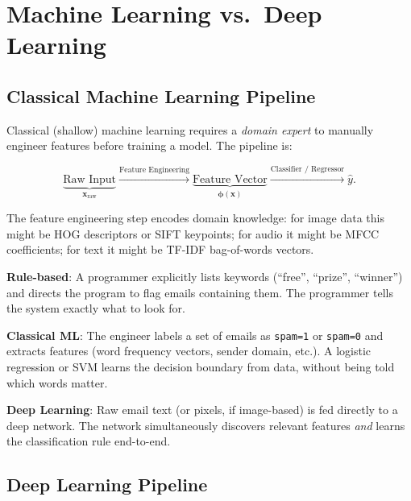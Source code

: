 \documentclass[12pt,a4paper]{article}
\begin{document}
\section{Machine Learning vs.\ Deep Learning}
\label{sec:mldl}

\subsection{Classical Machine Learning Pipeline}
\label{subsec:classical_ml}

Classical (shallow) machine learning requires a \emph{domain expert} to
manually engineer features before training a model.  The pipeline is:

\begin{equation}
  \label{eq:ml_pipeline}
  \underbrace{\text{Raw Input}}_{\mathbf{x}_\mathrm{raw}}
  \xrightarrow{\text{Feature Engineering}}
  \underbrace{\text{Feature Vector}}_{\boldsymbol{\phi}(\mathbf{x})}
  \xrightarrow{\text{Classifier / Regressor}}
  \hat{y}.
\end{equation}

The feature engineering step encodes domain knowledge: for image data this
might be HOG descriptors or SIFT keypoints; for audio it might be MFCC
coefficients; for text it might be TF-IDF bag-of-words vectors.

\begin{example}[title=Spam Email Detection (Rule-Based vs.\ ML)]
\textbf{Rule-based}: A programmer explicitly lists keywords (``free'',
``prize'', ``winner'') and directs the program to flag emails containing
them.  The programmer tells the system exactly what to look for.

\textbf{Classical ML}: The engineer labels a set of emails as
\texttt{spam=1} or \texttt{spam=0} and extracts features (word frequency
vectors, sender domain, etc.).  A logistic regression or SVM learns the
decision boundary from data, without being told which words matter.

\textbf{Deep Learning}: Raw email text (or pixels, if image-based) is fed
directly to a deep network.  The network simultaneously discovers relevant
features \emph{and} learns the classification rule end-to-end.
\end{example}

\subsection{Deep Learning Pipeline}
\label{subsec:dl_pipeline}
\end{document}
